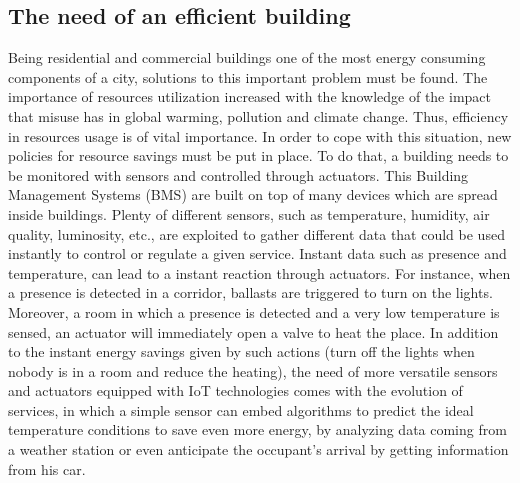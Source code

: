 \subsection{The need of an efficient building}
\label{subsec:effBuilding}
Being residential and commercial buildings one of the most energy consuming components\cite{perezLombard2008energy} of a city, solutions to this important problem must be found.
The importance of resources utilization increased with the knowledge of the impact that misuse has in global warming, pollution and climate change.
Thus, efficiency in resources usage is of vital importance.
In order to cope with this situation, new policies for resource savings must be put in place.
To do that, a building needs to be monitored with sensors and controlled through actuators.
This Building Management Systems (BMS) are built on top of many devices which are spread inside buildings.
Plenty of different sensors, such as temperature, humidity, air quality, luminosity, etc., are exploited to gather different data that could be used instantly to control or regulate a given service.
Instant data such as presence and temperature, can lead to a instant reaction through actuators.
For instance, when a presence is detected in a corridor, ballasts are triggered to turn on the lights.
Moreover, a room in which a presence is detected and a very low temperature is sensed, an actuator will immediately open a valve to heat the place.
In addition to the instant energy savings given by such actions (turn off the lights when nobody is in a room and reduce the heating), the need of more versatile sensors and actuators equipped with IoT technologies comes with the evolution of services, in which a simple sensor can embed algorithms to predict the ideal temperature conditions to save even more energy, by analyzing data coming from a weather station or even anticipate the occupant's arrival by getting information from his car.

